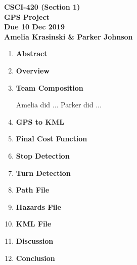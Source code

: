 \documentclass[12pt]{article}
\begin{document}
\begin{center} {\bf
	CSCI-420 (Section 1) \\
	GPS Project \\
	Due 10 Dec 2019 \\
	Amelia Krasinski \& Parker Johnson }
\end{center}

\begin{enumerate}
	\item \textbf{Abstract}
	
	\item \textbf{Overview}
	
	\item \textbf{Team Composition}
	
		Amelia did ...
		Parker did ...
		
	
	\item \textbf{GPS to KML}
	
	\item \textbf{Final Cost Function}
	
	\item \textbf{Stop Detection}
	
	\item \textbf{Turn Detection}
	
	\item \textbf{Path File}
	
	\item \textbf{Hazards File}
	
	\item \textbf{KML File}
	
	\item \textbf{Discussion}
	
	\item \textbf{Conclusion}
		
\end{enumerate}
\end{document}
